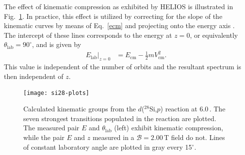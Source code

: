 The effect of kinematic compression as exhibited by 
HELIOS
is illustrated in Fig.~\ref{helios_basic}.   In practice, this effect is utilized by correcting for the slope of the kinematic curves by means of Eq.~\ref{ecm} and projecting onto the energy axis%
.  The intercept of these lines corresponds to the energy at $z=0$, or equivalently $\theta_\mathrm{lab}=90^\circ$, and is given by
\begin{equation}
\begin{split}
E_\mathrm{lab}\big|_{z=0}&=E_\mathrm{cm}-\frac{1}{2}m V_\mathrm{cm}^2.
\end{split}
\label{y_intercept}
\end{equation}
This value is independent of the number of orbits and the resultant spectrum is then independent of $z$. 

\begin{figure}[t]%
\centering
\texttt{[image: si28-plots]}%
\caption[Calculated kinematic groups from the $d$($^{28}$Si,$p$) reaction at 6.0\,\AMeV]{Calculated kinematic groups from the $d$($^{28}$Si,$p$) reaction at 6.0\,\AMeV.  The seven strongest transitions populated in the reaction are plotted.  The measured pair $E$ and $\theta_\mathrm{lab}$ (left) exhibit kinematic compression, while the pair $E$ and $z$ measured in a $\mathscr{B}=2.00$\,T field do not.  Lines of constant laboratory angle are plotted in gray every 15$^\circ$.}%
\label{helios_basic}%
\end{figure}
